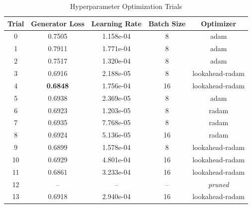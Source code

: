 \documentclass[a4paper, journal]{IEEEtran}
\begin{document}
\begin{table}[!htbp]
    \tiny
    \centering
    \caption{Hyperparameter Optimization Trials}
    \label{tab:all_hyperparameter_trials}
    \begin{tabular}{@{}ccccc@{}}
        \toprule
        \textbf{Trial} & \textbf{Generator Loss} & \textbf{Learning Rate} & \textbf{Batch Size} & \textbf{Optimizer} \\
        \midrule
        0              & 0.7505                  & 1.158e-04              & 8                   & adam               \\
        1              & 0.7911                  & 1.771e-04              & 8                   & adam               \\
        2              & 0.7517                  & 1.320e-04              & 8                   & adam               \\
        3              & 0.6916                  & 2.188e-05              & 8                   & lookahead-radam    \\
        4              & \textbf{0.6848}         & 1.756e-04              & 16                  & lookahead-radam    \\
        5              & 0.6938                  & 2.369e-05              & 8                   & adam               \\
        6              & 0.6923                  & 1.203e-05              & 8                   & radam              \\
        7              & 0.6935                  & 7.768e-05              & 8                   & radam              \\
        8              & 0.6924                  & 5.136e-05              & 16                  & radam              \\
        9              & 0.6899                  & 1.578e-04              & 8                   & lookahead-radam    \\
        10             & 0.6929                  & 4.801e-04              & 16                  & lookahead-radam    \\
        11             & 0.6861                  & 3.233e-04              & 16                  & lookahead-radam    \\
        12             & --                      & --                     & --                  & \textit{pruned}    \\
        13             & 0.6918                  & 2.940e-04              & 16                  & lookahead-radam    \\

\end{tabular}
\end{table}
\end{document}
